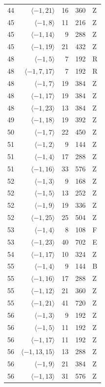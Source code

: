 \begin{longtable}{rrrrl}
44 & $\langle -1, 21\rangle$ & 16 & 360 & Z \\
45 & $\langle -1, 8\rangle$ & 11 & 216 & Z \\
45 & $\langle -1, 14\rangle$ & 9 & 288 & Z \\
45 & $\langle -1, 19\rangle$ & 21 & 432 & Z \\
48 & $\langle -1, 5\rangle$ & 7 & 192 & R \\
48 & $\langle -1, 7, 17\rangle$ & 7 & 192 & R \\
48 & $\langle -1, 7\rangle$ & 19 & 384 & Z \\
48 & $\langle -1, 17\rangle$ & 19 & 384 & Z \\
48 & $\langle -1, 23\rangle$ & 13 & 384 & Z \\
49 & $\langle -1, 18\rangle$ & 19 & 392 & Z \\
50 & $\langle -1, 7\rangle$ & 22 & 450 & Z \\
51 & $\langle -1, 2\rangle$ & 9 & 144 & Z \\
51 & $\langle -1, 4\rangle$ & 17 & 288 & Z \\
51 & $\langle -1, 16\rangle$ & 33 & 576 & Z \\
52 & $\langle -1, 3\rangle$ & 9 & 168 & Z \\
52 & $\langle -1, 5\rangle$ & 13 & 252 & Z \\
52 & $\langle -1, 9\rangle$ & 19 & 336 & Z \\
52 & $\langle -1, 25\rangle$ & 25 & 504 & Z \\
53 & $\langle -1, 4\rangle$ & 8 & 108 & F \\
53 & $\langle -1, 23\rangle$ & 40 & 702 & E \\
54 & $\langle -1, 17\rangle$ & 10 & 324 & Z \\
55 & $\langle -1, 4\rangle$ & 9 & 144 & B \\
55 & $\langle -1, 16\rangle$ & 17 & 288 & Z \\
55 & $\langle -1, 12\rangle$ & 21 & 360 & Z \\
55 & $\langle -1, 21\rangle$ & 41 & 720 & Z \\
56 & $\langle -1, 3\rangle$ & 9 & 192 & Z \\
56 & $\langle -1, 5\rangle$ & 11 & 192 & Z \\
56 & $\langle -1, 17\rangle$ & 11 & 192 & Z \\
56 & $\langle -1, 13, 15\rangle$ & 13 & 288 & Z \\
56 & $\langle -1, 9\rangle$ & 21 & 384 & Z \\
56 & $\langle -1, 13\rangle$ & 31 & 576 & Z \\

\end{longtable}
